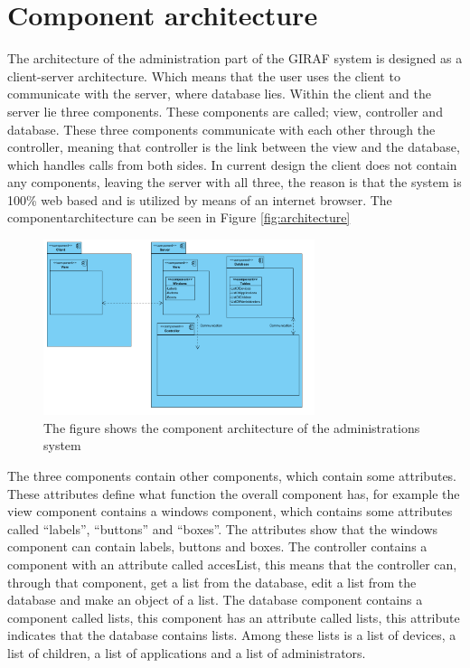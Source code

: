 \section{Component architecture}

The architecture of the administration part of the GIRAF system is designed as a client-server architecture. Which means that the user uses the client to communicate with the server, where database lies. Within the client and the server lie three components. These components are called; view, controller and database. These three components communicate with each other through the controller, meaning that controller is the link between the view and the database, which handles calls from both sides. In current design the client does not contain any components, leaving the server with all three, the reason is that the system is 100\% web based and is utilized by means of an internet browser. The componentarchitecture can be seen in Figure \vref{fig:architecture}

\begin{figure}[!ht]
\centering
\includegraphics[width=300px]{img/ComponentArketektur.png}
\caption{The figure shows the component architecture of the administrations system}
\label{fig:architecture}
\end{figure}

The three components contain other components, which contain some attributes. These attributes define what function the overall component has, for example the view component contains a windows component, which contains some attributes called ``labels'', ``buttons'' and ``boxes''. The attributes show that the windows component can contain labels, buttons and boxes.
The controller contains a component with an attribute called accesList, this means that the controller can, through that component, get a list from the database, edit a list from the database and make an object of a list.
The database component contains a component called lists, this component has an attribute called lists, this attribute indicates that the database contains lists. Among these lists is a list of devices, a list of children, a list of applications and a list of administrators.

